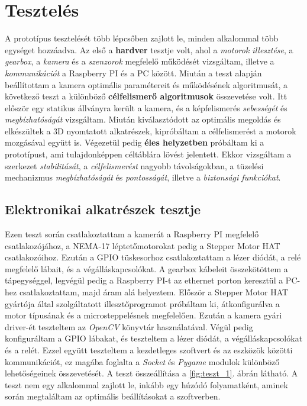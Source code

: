 \chapter{Tesztelés}
A prototípus tesztelését több lépcsőben zajlott le, minden alkalommal több egységet hozzáadva. Az első a \textbf{hardver} tesztje volt, ahol a \textsl{motorok illesztése}, a \textsl{gearbox}, a \textsl{kamera} és a \textsl{szenzorok} megfelelő működését vizsgáltam, illetve a \textsl{kommunikációt} a Raspberry PI és a PC között. Miután a teszt alapján beállítottam a kamera optimális paramétereit és működésének algoritmusát, a következő teszt a különböző \textbf{célfelismerő algoritmusok} összevetése volt. Itt először egy statikus állványra került a kamera, és a képfelismerés \textsl{sebességét} és \textsl{megbízhatóságát} vizsgáltam. Miután kiválasztódott az optimális megoldás és elkészültek a 3D nyomtatott alkatrészek, kipróbáltam a célfelismerést a motorok mozgásával együtt is. Végezetül pedig \textbf{éles helyzetben} próbáltam ki a prototípust, ami tulajdonképpen céltáblára lövést jelentett. Ekkor vizsgáltam a szerkezet \textsl{stabilitását}, a \textsl{célfelismerést} nagyobb távolságokban, a tüzelési mechanizmus \textsl{megbízhatóságát} és \textsl{pontosságát}, illetve a \textsl{biztonsági funkciókat}.

\section{Elektronikai alkatrészek tesztje}
Ezen teszt során csatlakoztattam a kamerát a Raspberry PI megfelelő csatlakozójához, a NEMA-17 léptetőmotorokat pedig a Stepper Motor HAT csatlakozóihoz. Ezután a GPIO tüskesorhoz csatlakoztattam a lézer diódát, a relé megfelelő lábait, és a végálláskapcsolókat. A gearbox kábeleit összekötöttem a tápegységgel, legvégül pedig a Raspberry PI-t az ethernet porton keresztül a PC-hez csatlakoztattam, majd áram alá helyeztem. Először a Stepper Motor HAT gyártója által szolgáltatott illesztőprogramot próbáltam ki, átkonfigurálva a motor típusának és a microsteppelésnek megfelelően. Ezután a kamera gyári driver-ét teszteltem az \textsl{OpenCV} könyvtár használatával. Végül pedig konfiguráltam a GPIO lábakat, és teszteltem a lézer diódát, a végálláskapcsolókat és a relét. Ezzel együtt teszteltem a kezdetleges szoftvert és az eszközök közötti kommunikációt, ez magába foglalta a \textsl{Socket} és \textsl{Pygame} modulok különböző lehetőségeinek összevetését. A teszt összeállítása a \ref{fig:teszt_1}. ábrán látható. A teszt nem egy alkalommal zajlott le, inkább egy húzódó folyamatként, aminek során megtaláltam az optimális beállításokat a szoftverben.

